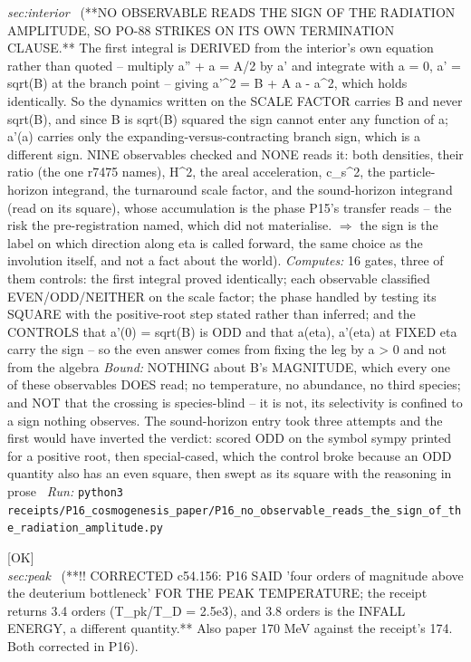 \begin{description}
\textit{sec:interior} \ (**NO OBSERVABLE READS THE SIGN OF THE RADIATION AMPLITUDE, SO PO-88 STRIKES ON ITS OWN TERMINATION CLAUSE.** The first integral is DERIVED from the interior's own equation rather than quoted -- multiply a'' + a = A/2 by a' and integrate with a = 0, a' = sqrt(B) at the branch point -- giving a'\textasciicircum{}2 = B + A a - a\textasciicircum{}2, which holds identically. So the dynamics written on the SCALE FACTOR carries B and never sqrt(B), and since B is sqrt(B) squared the sign cannot enter any function of a; a'(a) carries only the expanding-versus-contracting branch sign, which is a different sign. NINE observables checked and NONE reads it: both densities, their ratio (the one r7475 names), H\textasciicircum{}2, the areal acceleration, c\_s\textasciicircum{}2, the particle-horizon integrand, the turnaround scale factor, and the sound-horizon integrand (read on its square), whose accumulation is the phase P15's transfer reads -- the risk the pre-registration named, which did not materialise. \ensuremath{\Rightarrow} the sign is the label on which direction along eta is called forward, the same choice as the involution itself, and not a fact about the world). 
\emph{Computes:} 16 gates, three of them controls: the first integral proved identically; each observable classified EVEN/ODD/NEITHER on the scale factor; the phase handled by testing its SQUARE with the positive-root step stated rather than inferred; and the CONTROLS that a'(0) = sqrt(B) is ODD and that a(eta), a'(eta) at FIXED eta carry the sign -- so the even answer comes from fixing the leg by a > 0 and not from the algebra
 \emph{Bound:}  NOTHING about B's MAGNITUDE, which every one of these observables DOES read; no temperature, no abundance, no third species; and NOT that the crossing is species-blind -- it is not, its selectivity is confined to a sign nothing observes.  The sound-horizon entry took three attempts and the first would have inverted the verdict: scored ODD on the symbol sympy printed for a positive root, then special-cased, which the control broke because an ODD quantity also has an even square, then swept as its square with the reasoning in prose
\ \emph{Run:} \texttt{python3 receipts/P16\_cosmogenesis\_paper/P16\_no\_observable\_reads\_the\_sign\_of\_the\_radiation\_amplitude.py}
\item[\rcptlabel{P16_peak_temperature}{P16R8}\textbf{P16R8}\quad\texttt{P16\_peak\_temperature}]\hfill\textsf{[OK]}\\
\textit{sec:peak} \ (**!! CORRECTED c54.156: P16 SAID 'four orders of magnitude above the deuterium bottleneck' FOR THE PEAK TEMPERATURE; the receipt returns 3.4 orders (T\_pk/T\_D = 2.5e3), and 3.8 orders is the INFALL ENERGY, a different quantity.** Also paper 170 MeV against the receipt's 174. Both corrected in P16). 

\end{description}
